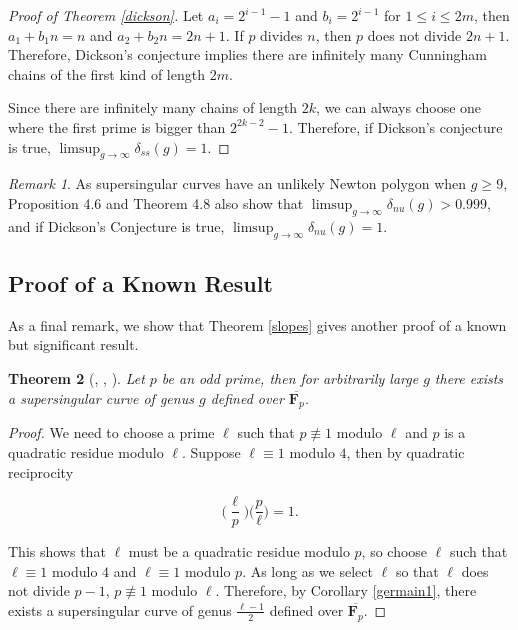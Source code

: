 \documentclass{article}
\newtheorem{theorem}{Theorem}[section]
\theoremstyle{remark}
\newtheorem{remark}[theorem]{Remark}
\theoremstyle{definition}
\begin{document}
\begin{proof}[Proof of Theorem \ref{dickson}]
    Let $a_i = 2^{i-1}-1$ and $b_i = 2^{i-1}$ for $1 \leq i \leq 2m$, then $a_1+b_1n = n$ and $a_2+b_2n = 2n+1$. If $p$ divides $n$, then $p$ does not divide $2n+1$. Therefore, Dickson's conjecture implies there are infinitely many Cunningham chains of the first kind of length $2m$.

    \par Since there are infinitely many chains of length $2k$, we can always choose one where the first prime is bigger than $2^{2k-2}-1$. Therefore, if Dickson's conjecture is true, $\limsup_{g \to \infty} \delta_{ss}(g) = 1$. 
\end{proof}


\begin{remark}
    As supersingular curves have an unlikely Newton polygon when $g \geq 9$, Proposition 4.6 and Theorem 4.8 also show that $\limsup_{g \to \infty} \delta_{nu}(g) > 0.999$, and if Dickson's Conjecture is true, $\limsup_{g \to \infty} \delta_{nu}(g) = 1$.
\end{remark}

\subsection{Proof of a Known Result}
As a final remark, we show that Theorem \ref{slopes} gives another proof of a known but significant result.

\begin{theorem}[, , ]
    Let $p$ be an odd prime, then for arbitrarily large $g$ there exists a supersingular curve of genus $g$ defined over $\overline{\mathbf{F}_p}$.
\end{theorem}

\begin{proof}
    We need to choose a prime $\ell$ such that $p \not \equiv 1$ modulo $\ell$ and $p$ is a quadratic residue modulo $\ell$. Suppose $\ell \equiv 1$ modulo $4$, then by quadratic reciprocity 
    
    \[\Biggl (\frac{\ell}{p} \Biggr) \Biggl(\frac{p}{\ell} \Biggr) = 1.\]
    
    This shows that $\ell$ must be a quadratic residue modulo $p$, so choose $\ell$ such that $\ell \equiv 1$ modulo $4$ and $\ell \equiv 1$ modulo $p$. As long as we select $\ell$ so that $\ell$ does not divide $p - 1$, $p \not \equiv 1$ modulo $\ell$. Therefore, by Corollary \ref{germain1}, there exists a supersingular curve of genus $\frac{\ell-1}{2}$ defined over $\overline{\mathbf{F}_p}$.
\end{proof}




\end{document}
